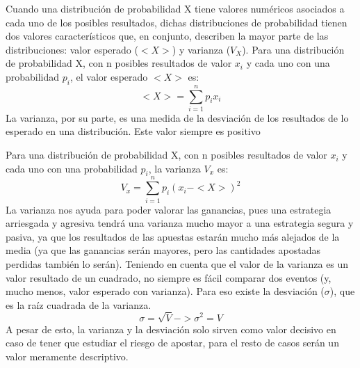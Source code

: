 Cuando una distribución de probabilidad X tiene valores numéricos asociados a cada uno de los posibles resultados, dichas distribuciones de probabilidad tienen dos valores característicos que, en conjunto, describen la mayor parte de las distribuciones: valor esperado ($<X>$) y varianza ($V_X$).
Para una distribución de probabilidad X, con n posibles resultados de valor $x_i$ y cada uno con una probabilidad $p_i$, el valor esperado $<X>$ es: 
\[
<X> =\sum_{i=1}^ n p_ix_i
\]
La varianza, por su parte, es una medida de la desviación de los resultados de lo esperado en una distribución. Este valor siempre es positivo


Para una distribución de probabilidad X, con n posibles resultados de valor $x_i$ y cada uno con una probabilidad $p_i$, la varianza $V_x$ es: 
\[
V_x= \sum_{i=1}^ n p_i(x_i - <X>)^2
\]
La varianza nos ayuda para poder valorar las ganancias, pues una estrategia arriesgada y agresiva tendrá una varianza mucho mayor a una estrategia segura y pasiva, ya que los resultados de las apuestas estarán mucho más alejados de la media (ya que las ganancias serán mayores, pero las cantidades apostadas perdidas también lo serán). 
Teniendo en cuenta que el valor de la varianza es un valor resultado de un cuadrado, no siempre es fácil comparar dos eventos (y, mucho menos, valor esperado con varianza). Para eso existe la desviación ($\sigma$), que es la raíz cuadrada de la varianza.
\[
	\sigma =\sqrt{V}   -> \sigma^2= V
\]
A pesar de esto, la varianza y la desviación solo sirven como valor decisivo en caso de tener que estudiar el riesgo de apostar, para el resto de casos serán un valor meramente descriptivo.
